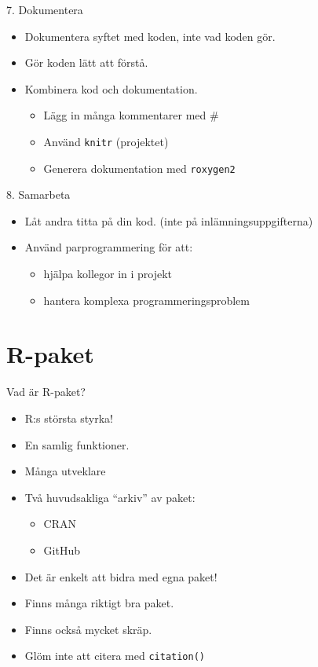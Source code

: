 \documentclass[
  11pt,
  ignorenonframetext,
]{beamer}
\providecommand{\tightlist}{%
  \setlength{\itemsep}{0pt}\setlength{\parskip}{0pt}}
\begin{document}
\begin{frame}{7. Dokumentera}
\label{dokumentera}
\begin{itemize}
\tightlist
\item
  Dokumentera syftet med koden, inte vad koden gör.
\item
  Gör koden lätt att förstå.
\item
  Kombinera kod och dokumentation.

  \begin{itemize}
  \tightlist
  \item
    Lägg in många kommentarer med \#
  \item
    Använd \texttt{knitr} (projektet)
  \item
    Generera dokumentation med \texttt{roxygen2}
  \end{itemize}
\end{itemize}
\end{frame}

\begin{frame}{8. Samarbeta}
\label{samarbeta}
\begin{itemize}
\tightlist
\item
  Låt andra titta på din kod. (inte på inlämningsuppgifterna)
\item
  Använd parprogrammering för att:

  \begin{itemize}
  \tightlist
  \item
    hjälpa kollegor in i projekt
  \item
    hantera komplexa programmeringsproblem
  \end{itemize}
\end{itemize}
\end{frame}

\section{R-paket}\label{r-paket}

\begin{frame}{Vad är R-paket?}
\label{vad-uxe4r-r-paket}
\begin{itemize}
\tightlist
\item
  R:s största styrka!
\item
  En samlig funktioner.
\item
  Många utveklare
\item
  Två huvudsakliga ``arkiv'' av paket:

  \begin{itemize}
  \tightlist
  \item
    CRAN
  \item
    GitHub
  \end{itemize}
\item
  Det är enkelt att bidra med egna paket!
\item
  Finns många riktigt bra paket.
\item
  Finns också mycket skräp.
\item
  Glöm inte att citera med \texttt{citation()}
\end{itemize}
\end{frame}
\end{document}
